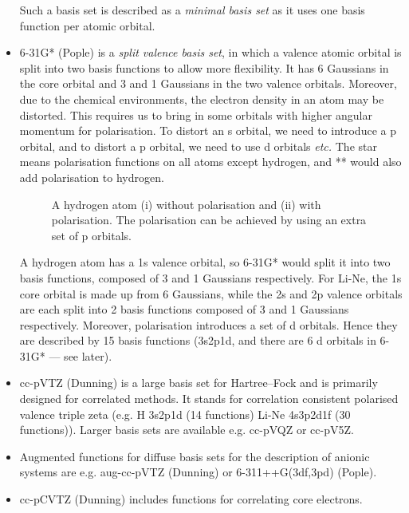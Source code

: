 \documentclass{article}
\theoremstyle{plain}\theoremheaderfont{\normalfont\itshape}\theorembodyfont{\rmfamily}\theoremseparator{.}\newtheorem*{rem}{Remark}\newtheorem*{ex}{Example}\newtheorem*{proof}{Proof}\newtheorem*{altp}{Alternative proof}
\theoremstyle{plain}\theoremheaderfont{\normalfont\bfseries}\theorembodyfont{\rmfamily}\theoremseparator{.}\newtheorem{thm}{Theorem}[section]\newtheorem{lem}[thm]{Lemma}\newtheorem{prop}[thm]{Proposition}\newtheorem*{cor}{Corollary}\newtheorem{defn}[thm]{Definition}\newtheorem{clm}[thm]{Claim}\newtheorem{clminproof}{Claim}
\theoremstyle{break}\theoremheaderfont{\normalfont\itshape}\theorembodyfont{\rmfamily}\theoremseparator{.\medskip}\newtheorem*{proofskip}{Proof}\newtheorem*{exs}{Examples}\newtheorem*{rems}{Remarks}
\theoremstyle{break}\theoremheaderfont{\normalfont\bfseries}\theorembodyfont{\rmfamily}\theoremseparator{.\medskip}\newtheorem{lemskip}[thm]{Lemma}\newtheorem{defnskip}[thm]{Definition}\newtheorem{propskip}[thm]{Proposition}\newtheorem{thmskip}[thm]{Theorem}
\numberwithin{equation}{section}
\begin{document}
\begin{itemize}[topsep=0pt,parsep=1em]
        Such a basis set is described as a \textit{minimal basis set} as it uses one basis function per atomic orbital.
        \item 6-31G* (Pople) is a \textit{split valence basis set}, in which a valence atomic orbital is split into two basis functions to allow more flexibility. It has 6 Gaussians in the core orbital and 3 and 1 Gaussians in the two valence orbitals. Moreover, due to the chemical environments, the electron density in an atom may be distorted. This requires us to bring in some orbitals with higher angular momentum for polarisation. To distort an s orbital, we need to introduce a p orbital, and to distort a p orbital, we need to use d orbitals \textit{etc.} The star means polarisation functions on all atoms except hydrogen, and ** would also add polarisation to hydrogen.
        \begin{figure}[ht!]
            \centering
            \caption{A hydrogen atom (i) without polarisation and (ii) with polarisation. The polarisation can be achieved by using an extra set of p orbitals.}
        \end{figure}

        A hydrogen atom has a 1s valence orbital, so 6-31G* would split it into two basis functions, composed of 3 and 1 Gaussians respectively. For Li-Ne, the 1s core orbital is made up from 6 Gaussians, while the 2s and 2p valence orbitals are each split into 2 basis functions composed of 3 and 1 Gaussians respectively. Moreover, polarisation introduces a set of d orbitals. Hence they are described by 15 basis functions (3s2p1d, and there are 6 d orbitals in 6-31G* --- see later).
        \item  cc-pVTZ (Dunning) is a large basis set for Hartree--Fock and is primarily designed for correlated methods. It stands for correlation consistent polarised valence triple zeta (e.g. H 3s2p1d (14 functions) Li-Ne 4s3p2d1f (30 functions)). Larger basis sets are available e.g. cc-pVQZ or cc-pV5Z.
        \item Augmented functions for diffuse basis sets for the description of anionic systems are e.g. aug-cc-pVTZ (Dunning) or 6-311++G(3df,3pd) (Pople).
        \item cc-pCVTZ (Dunning) includes functions for correlating core electrons.
    \end{itemize}
\end{document}
